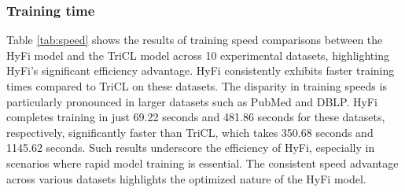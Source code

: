 \begin{table*}[t!]
\centering
\caption{Ablation study exploring various configurations of the contrastive learning framework `w/o' stands for `without'.}
\label{tab:ablation}
\end{table*}

\subsubsection{Training time}


Table \ref{tab:speed} shows the results of training speed comparisons between the HyFi model and the TriCL model across 10 experimental datasets, highlighting HyFi's significant efficiency advantage. HyFi consistently exhibits faster training times compared to TriCL on these datasets. The disparity in training speeds is particularly pronounced in larger datasets such as PubMed and DBLP. HyFi completes training in just 69.22 seconds and 481.86 seconds for these datasets, respectively, significantly faster than TriCL, which takes 350.68 seconds and 1145.62 seconds. Such results underscore the efficiency of HyFi, especially in scenarios where rapid model training is essential. The consistent speed advantage across various datasets highlights the optimized nature of the HyFi model.




